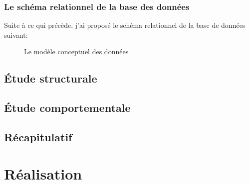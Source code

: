 \documentclass[a4paper]{report}
\begin{document}
\begin{doublespace}
	\subsection{Le schéma relationnel de la base des données}
	Suite à ce qui précède, j'ai proposé le schéma relationnel de la base de données suivant:
	\begin{figure}[H]
		\begin{center}
			\caption{Le modèle conceptuel des données}
		\end{center}
	\end{figure}
	\section{Étude structurale}
	\section{Étude comportementale}
	\section{Récapitulatif}
	\chapter{Réalisation}
	\renewcommand{\headrulewidth}{1pt}
	\fancyhead[L]{\hspace*{5cm}}
\end{doublespace}
\appendix
\end{document}
